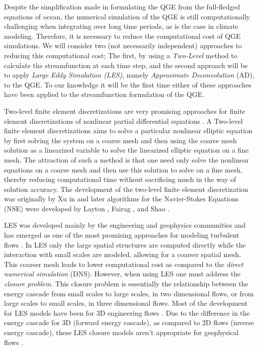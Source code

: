 Despite the simplification made in formulating the QGE from the full-fledged equations of
ocean, the numerical simulation of the QGE is still computationally challenging when integrating
over long time periods, as is the case in climate modeling. Therefore, it is necessary to reduce the
computational cost of QGE simulations. We will consider two (not necessarily independent) approaches
to reducing this computational cost; The first, by using a \emph{Two-Level} method to calculate the
streamfunction at each time step, and the second approach will be to apply \emph{Large Eddy
Simulation (LES)}, namely \emph{Approximate Deconvolution} (AD), to the QGE. To our knowledge it
will be the first time either of these approaches have been applied to the streamfunction formulation
of the QGE.

Two-level finite element discretizations are very promising approaches for finite element
discretizations of nonlinear partial differential equations \cite{Fairag98,Layton93}. A Two-level
finite element discretizations aims to solve a particular nonlinear elliptic equation by first
solving the system on a coarse mesh and then using the coarse mesh solution as a linearized variable
to solve the linearized elliptic equation on  a fine mesh. The attraction of such a method is that
one need only solve the nonlinear equations on a coarse mesh and then use this solution to solve on
a fine mesh, thereby reducing computational time without sacrificing much in the way of solution
accuracy. The development of the two-level finite element discretization was originally by Xu in
\cite{Xu94} and later algorithms for the Navier-Stokes Equations (NSE) were developed by Layton \cite{Layton93}, Fairag
\cite{Fairag98, Fairag03}, and Shao \cite{Shao11}.

LES was developed mainly by the engineering and geophysics communities and has emerged as one of the
most promising approaches for modeling turbulent flows \cite{Iliescu00}. In LES only the large
spatial structures are computed directly while the interaction with small scales are modeled,
allowing for a coarser spatial mesh. This coarser mesh leads to lower computational cost as compared
to the \emph{direct numerical simulation} (DNS). However, when using LES one must address the
\emph{closure problem}.  This closure problem is essentially the relationship between the energy
cascade from small scales to large scales, in two dimensional flows, or from large scales to small
scales, in three dimensional flows. Most of the development for LES models have been for 3D
engineering flows \cite{Berselli06}.  Due to the difference in the energy cascade for 3D (forward
energy cascade), as compared to 2D flows (inverse energy cascade), these LES closure models aren't
appropriate for geophysical flows \cite{San11}. 

